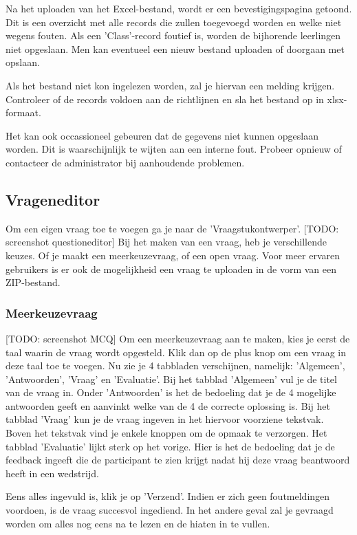 \documentclass[]{article}
\begin{document}
Na het uploaden van het Excel-bestand, wordt er een bevestigingspagina getoond. Dit is een overzicht met alle records die zullen toegevoegd worden en welke niet wegens fouten. Als een 'Class'-record foutief is, worden de bijhorende leerlingen niet opgeslaan. Men kan eventueel een nieuw bestand uploaden of doorgaan met opslaan.

Als het bestand niet kon ingelezen worden, zal je hiervan een melding krijgen. Controleer of de records voldoen aan de richtlijnen en sla het bestand op in xlsx-formaat.

Het kan ook occassioneel gebeuren dat de gegevens niet kunnen opgeslaan worden. Dit is waarschijnlijk te wijten aan een interne fout. Probeer opnieuw of contacteer de administrator bij aanhoudende problemen. 

\subsection{Vrageneditor}

Om een eigen vraag toe te voegen ga je naar de 'Vraagstukontwerper'. [TODO: screenshot questioneditor] Bij het maken van een vraag, heb je verschillende keuzes. Of je maakt een meerkeuzevraag, of een open vraag. Voor meer ervaren gebruikers is er ook de mogelijkheid een vraag te uploaden in de vorm van een ZIP-bestand.

\subsubsection{Meerkeuzevraag}

[TODO: screenshot MCQ] Om een meerkeuzevraag aan te maken, kies je eerst de taal waarin de vraag wordt opgesteld. Klik dan op de plus knop om een vraag in deze taal toe te voegen. Nu zie je 4 tabbladen verschijnen, namelijk: 'Algemeen', 'Antwoorden', 'Vraag' en 'Evaluatie'. Bij het tabblad 'Algemeen' vul je de titel van de vraag in. Onder 'Antwoorden' is het de bedoeling dat je de 4 mogelijke antwoorden geeft en aanvinkt welke van de 4 de correcte oplossing is. Bij het tabblad 'Vraag' kun je de vraag ingeven in het hiervoor voorziene tekstvak. Boven het tekstvak vind je enkele knoppen om de opmaak te verzorgen. Het tabblad 'Evaluatie' lijkt sterk op het vorige. Hier is het de bedoeling dat je de feedback ingeeft die de participant te zien krijgt nadat hij deze vraag beantwoord heeft in een wedstrijd. 

Eens alles ingevuld is, klik je op 'Verzend'. Indien er zich geen foutmeldingen voordoen, is de vraag succesvol ingediend. In het andere geval zal je gevraagd worden om alles nog eens na te lezen en de hiaten in te vullen.
\end{document}
